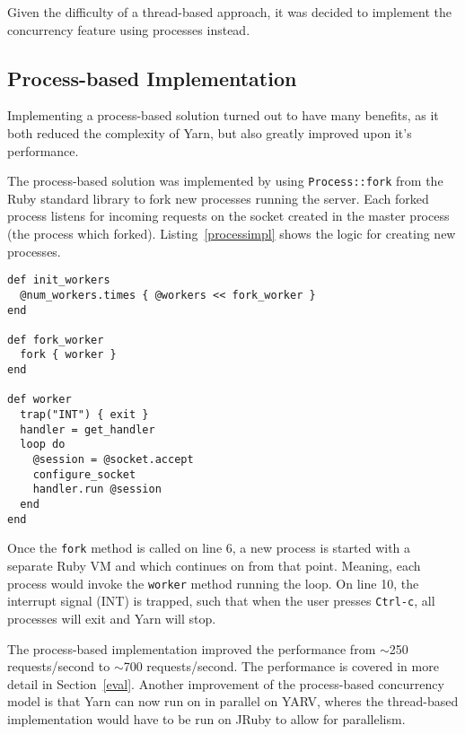 Given the difficulty of a thread-based approach, it was decided to implement
the concurrency feature using processes instead.

\subsection{Process-based Implementation}
Implementing a process-based solution turned out to have many benefits, as it
both reduced the complexity of Yarn, but also greatly improved upon it's
performance.

The process-based solution was implemented by using \texttt{Process::fork}
from the Ruby standard library to fork new processes running the server. Each forked
process listens for incoming requests on the socket created in the master
process (the process which forked). Listing~\ref{processimpl} shows the logic for creating new processes.

\bigskip
\begin{lstlisting}[label=processimpl,caption=Process-based implementation
(Yarn/lib/yarn/server.rb:75)]
def init_workers
  @num_workers.times { @workers << fork_worker }
end

def fork_worker
  fork { worker }
end

def worker
  trap("INT") { exit }
  handler = get_handler
  loop do
    @session = @socket.accept
    configure_socket
    handler.run @session
  end
end
\end{lstlisting}

Once the \texttt{fork} method is called on line 6, a new process is started
with a separate Ruby VM and which continues on from that point. Meaning, each
process would invoke the \texttt{worker} method running the loop. On line 10, the
interrupt signal (INT) is trapped, such that when the user presses
\texttt{Ctrl-c}, all processes will exit and Yarn will stop. 

The process-based implementation improved the performance from $\sim$250
requests/second to $\sim$700 requests/second. The performance is covered in
more detail in Section~\ref{eval}. Another improvement of the process-based
concurrency model is that Yarn can now run on in parallel on YARV, wheres the
thread-based implementation would have to be run on JRuby to allow for
parallelism.

